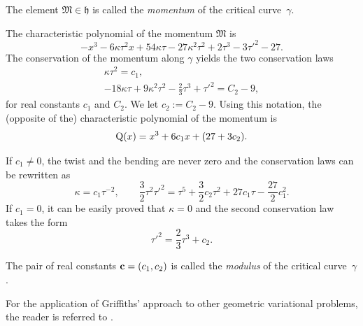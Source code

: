 \documentclass[pdftex]{sigma}
\numberwithin{equation}{section}
\begin{document}
\begin{Definition}
The element $\mathfrak{M}\in \mathfrak{h}$ is called the \textit{momentum} of
the critical curve~$\gamma$.
\end{Definition}

The characteristic polynomial of the momentum $\mathfrak{M}$ is
\begin{equation*}%
 -x^3 -6\kappa\tau^2 x +54\kappa\tau -27\kappa^2 \tau^2 +2\tau^3 -3\tau'^2 -27  .
 \end{equation*}
 The conservation of the momentum along {$\gamma$}
yields the two conservation laws
\begin{gather*}%
\kappa \tau^2 = {c_1} \label{CM1} ,\\
 - 18 \kappa \tau + 9 \kappa^2 \tau^2 -\frac23 \tau^3 + \tau'^2 = C_2 -9 \label{CM2} ,
\end{gather*}
for real constants $c_1$ and $C_2$. We let $c_2 := C_2-9$.
Using this notation,
the (opposite of the) characteristic polynomial of the momentum is
\begin{equation*}%
 {\rm Q}(x)=x^3+6c_1x+(27+3c_2).
 \end{equation*}

 If $c_1\neq 0$, the twist and the bending are never zero and the conservation laws can be rewritten as
\begin{equation}\label{cons-momentum-bis}
 \kappa=c_1\tau^{-2},\qquad \frac{3}{2} \tau^2\tau'^2=\tau^5+\frac{3}{2}c_2\tau^2+27c_1\tau-\frac{27}{2}c_1^2.
 \end{equation}
If $c_1=0$, it can be easily proved that $\kappa=0$ and the second conservation law takes the form
\begin{equation*}%
 \tau'^2 =\frac{2}{3}\tau^3+c_2.
 \end{equation*}
%
\begin{Definition}
The pair of real constants ${\bf c}=(c_1, c_2)$ is called the
\textit{modulus} of the critical curve~$\gamma$.

\end{Definition}

\begin{Remark}
For the application of Griffiths' approach to
other geometric variational problems, the reader is referred to
\cite{DMN,EMN-JMAA,Gr,GM,MN-CQG,MN-SIAM,MN-CAG}.
\end{Remark}
\end{document}
